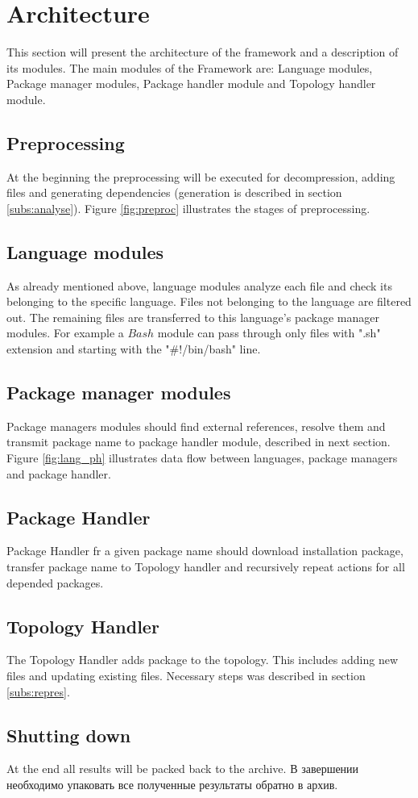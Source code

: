 \section{Architecture}\label{sec:arch}
This section will present the architecture of the framework and a description of its modules.
The main modules of the Framework are: Language modules, Package manager modules, Package handler module and Topology handler module.

\subsection{Preprocessing} \label{subs:archpp}
At the beginning the preprocessing will be executed for decompression, adding files and generating dependencies (generation is described in section \ref{subs:analyse}).
Figure \ref{fig:preproc} illustrates the stages of preprocessing.

\subsection{Language modules} \label{subs:archlm}
As already mentioned above, language modules analyze each file and check its belonging to the specific language. 
Files not belonging to the language are filtered out.
The remaining files are transferred to this language's package manager modules.
For example a $Bash$ module can pass through only files with ".sh" extension and starting with the "\#!/bin/bash" line.
\subsection{Package manager modules} \label{subs:archpmm}
Package managers modules should find external references, resolve them and transmit package name to package handler module, described in next section.
Figure \ref{fig:lang_ph} illustrates data flow between languages, package managers and package handler.


\subsection{Package Handler} \label{subs:archph}
Package Handler fr a given package name should download installation package, transfer package name to Topology handler and recursively repeat actions for all depended packages.

\subsection{Topology Handler} \label{subs:archtop}
The Topology Handler adds package to the topology. 
This includes adding new files and updating existing files. 
Necessary steps was described in section \ref{subs:repres}.

\subsection{Shutting down} \label{subs:archend}
At the end all results will be packed back to the archive.
В завершении необходимо упаковать все полученные результаты обратно в архив.



\fi